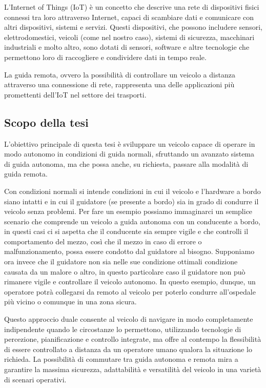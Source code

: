\noindent L'Internet of Things (IoT) è un concetto che descrive una rete di dispositivi fisici connessi tra loro attraverso Internet, capaci di scambiare dati e comunicare con altri dispositivi, sistemi e servizi. Questi dispositivi, che possono includere sensori, elettrodomestici, veicoli (come nel nostro caso), sistemi di sicurezza, macchinari industriali e molto altro, sono dotati di sensori, software e altre tecnologie che permettono loro di raccogliere e condividere dati in tempo reale.

\noindent La guida remota, ovvero la possibilità di controllare un veicolo a distanza attraverso una connessione di rete, rappresenta una delle applicazioni più promettenti dell'IoT nel settore dei trasporti.

\subsection{Scopo della tesi}
L'obiettivo principale di questa tesi è sviluppare un veicolo capace di operare in modo autonomo in condizioni di guida normali, sfruttando un avanzato sistema di guida autonoma, ma che possa anche, su richiesta, passare alla modalità di guida remota.

\noindent Con condizioni normali si intende condizioni in cui il veicolo e l'hardware a bordo siano intatti e in cui il guidatore (se presente a bordo) sia in grado di condurre il veicolo senza problemi. Per fare un esempio possiamo immaginarci un semplice scenario che comprende un veicolo a guida autonoma con un conducente a bordo, in questi casi ci si aspetta che il conducente sia sempre vigile e che controlli il comportamento del mezzo, così che il mezzo in caso di errore o malfunzionamento, possa essere condotto dal guidatore al bisogno. Supponiamo ora invece che il guidatore non sia nelle sue condizione ottimali condizione causata da un malore o altro, in questo particolare caso il guidatore non può rimanere vigile e controllare il veicolo autonomo. In questo esempio, dunque, un operatore potrà collegarsi da remoto al veicolo per poterlo condurre all'ospedale più vicino o comunque in una zona sicura.

\noindent Questo approccio duale consente al veicolo di navigare in modo completamente indipendente quando le circostanze lo permettono, utilizzando tecnologie di percezione, pianificazione e controllo integrate, ma offre al contempo la flessibilità di essere controllato a distanza da un operatore umano qualora la situazione lo richieda. La possibilità di commutare tra guida autonoma e remota mira a garantire la massima sicurezza, adattabilità e versatilità del veicolo in una varietà di scenari operativi.

